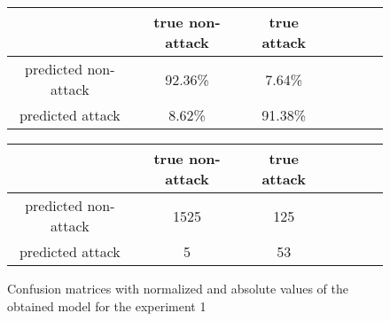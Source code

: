 \documentclass{article}
\begin{document}
\begin{figure}[h!]
    \centering
    \begin{tabular}{ |c|c|c|c|c|c|c| }
     \hline
      & true non-attack & true attack \\
     \hline
     predicted non-attack & 92.36\% & 7.64\% \\
     \hline
     predicted attack & 8.62\% & 91.38\% \\
     \hline
    \end{tabular}

    \vspace{0.2cm}

    \centering
    \begin{tabular}{ |c|c|c|c|c|c|c| }
     \hline
      & true non-attack & true attack \\
     \hline
     predicted non-attack & 1525 & 125 \\
     \hline
     predicted attack & 5 & 53 \\
     \hline
    \end{tabular}

    \caption{Confusion matrices with normalized and absolute values of the obtained model for the experiment 1}
    \label{fig-exp1-obtained-model}
\end{figure}
\end{document}
